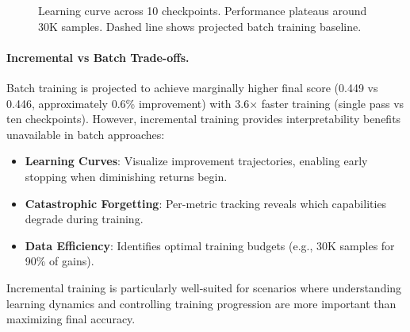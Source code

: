 \documentclass[sigconf]{acmart}
\begin{document}
\begin{figure}[t]
\centering
{}
\caption{Learning curve across 10 checkpoints. Performance plateaus around 30K samples. Dashed line shows projected batch training baseline.}
\label{fig:learning-curve}
\end{figure}

\paragraph{Incremental vs Batch Trade-offs.}
Batch training is projected to achieve marginally higher final score (0.449 vs 0.446, approximately 0.6\% improvement) with 3.6× faster training (single pass vs ten checkpoints). However, incremental training provides interpretability benefits unavailable in batch approaches:

\begin{itemize}
    \item \textbf{Learning Curves}: Visualize improvement trajectories, enabling early stopping when diminishing returns begin.
    \item \textbf{Catastrophic Forgetting}: Per-metric tracking reveals which capabilities degrade during training.
    \item \textbf{Data Efficiency}: Identifies optimal training budgets (e.g., 30K samples for 90\% of gains).
\end{itemize}

Incremental training is particularly well-suited for scenarios where understanding learning dynamics and controlling training progression are more important than maximizing final accuracy.
\end{document}
